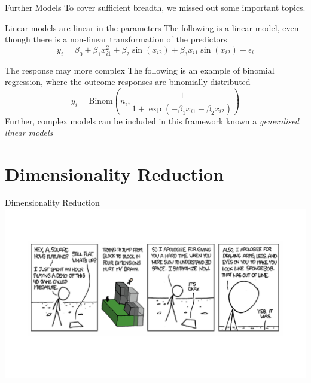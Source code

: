 \documentclass{bredelebeamer}
\begin{document}
\begin{frame}{Further Models}
To cover sufficient breadth, we missed out some important topics.
\begin{exampleblock}{Linear models are linear in the parameters}
	The following is a linear model, even though there is a non-linear transformation of the predictors
\begin{equation}
	y_i = \beta_0 + \beta_1x_{i1}^2 + \beta_2 \sin(x_{i
2}) + \beta_3 x_{i1}\sin(x_{i2}) + \epsilon_i
\end{equation}
\end{exampleblock}
\begin{exampleblock}{The response may more complex}
	The following is an example of binomial regression, where the outcome responses
	are binomially distributed
	\begin{equation}
	y_i = \text{Binom}\left(n_i, \frac{1}{1 + \exp(- \beta_1x_{i1} - \beta_2x_{i2})}\right)
	\end{equation}
	Further, complex models can be included in this framework known a \textit{generalised linear models}
\end{exampleblock}

\end{frame}

\section{Dimensionality Reduction}

\begin{frame}{Dimensionality Reduction}
\includegraphics[width=1\textwidth]{dimreduce}
\end{frame}
\end{document}
